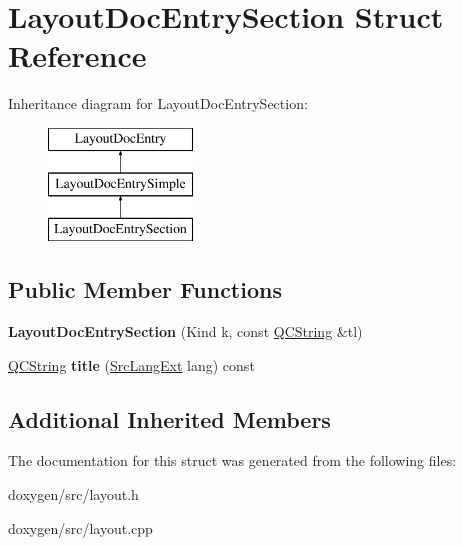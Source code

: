 \hypertarget{struct_layout_doc_entry_section}{}\section{Layout\+Doc\+Entry\+Section Struct Reference}
\label{struct_layout_doc_entry_section}
Inheritance diagram for Layout\+Doc\+Entry\+Section\+:\begin{figure}[H]
\begin{center}
\leavevmode
\includegraphics[height=3.000000cm]{struct_layout_doc_entry_section}
\end{center}
\end{figure}
\subsection*{Public Member Functions}
\begin{DoxyCompactItemize}
\item 
\mbox{\label{struct_layout_doc_entry_section_a9b9b6e896d6ed807088a6800cfa6dafe}} 
{\bfseries Layout\+Doc\+Entry\+Section} (Kind k, const \mbox{\hyperlink{class_q_c_string}{Q\+C\+String}} \&tl)
\item 
\mbox{\label{struct_layout_doc_entry_section_a363185aa61931f8aa77b4a6c71b6c62b}} 
\mbox{\hyperlink{class_q_c_string}{Q\+C\+String}} {\bfseries title} (\mbox{\hyperlink{types_8h_a9974623ce72fc23df5d64426b9178bf2}{Src\+Lang\+Ext}} lang) const
\end{DoxyCompactItemize}
\subsection*{Additional Inherited Members}


The documentation for this struct was generated from the following files\+:\begin{DoxyCompactItemize}
\item 
doxygen/src/layout.\+h\item 
doxygen/src/layout.\+cpp\end{DoxyCompactItemize}
